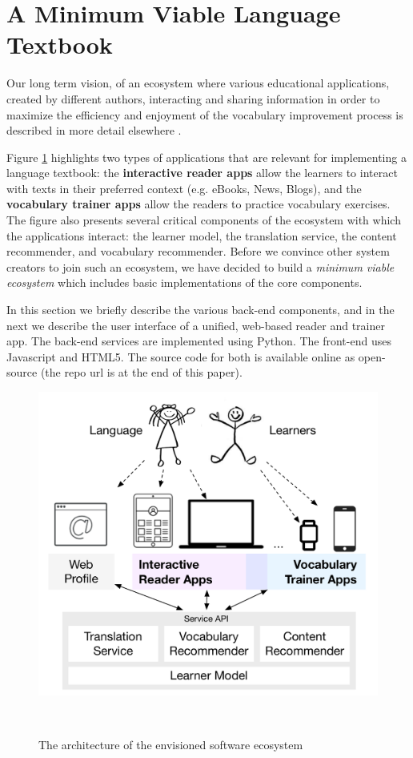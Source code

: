 
\section{A Minimum Viable Language Textbook}
\label{sec:system}

Our long term vision, of an ecosystem where various educational applications, created by different authors, interacting and sharing information in order to maximize the efficiency and enjoyment of the vocabulary improvement process is described in more detail elsewhere \cite{Lungu16}. 

Figure \ref{fig:architecture} highlights two types of applications that are relevant for implementing a language textbook: the {\bf interactive reader apps} allow the learners to interact with texts in their preferred context (e.g. eBooks, News, Blogs), and the {\bf vocabulary trainer apps} allow the readers to practice vocabulary exercises. 
% 
The figure also presents several critical components of the ecosystem with which the applications interact: the learner model, the translation service, the content recommender, and vocabulary recommender. Before we convince other system creators to join such an ecosystem, we have decided to build a {\em minimum viable ecosystem} which includes basic implementations of the core components. 

In this section we briefly describe the various back-end components, and in the next we describe the user interface of a unified, web-based reader and trainer app. The back-end services are implemented using Python. The front-end uses Javascript and HTML5. The source code for both is available online as open-source (the repo url is at the end of this paper).

\begin{figure}[h!]
\centering
  \includegraphics[width=0.75\columnwidth,trim={0 10 0 10},clip]{figures/zeeguu-architecture.pdf}
  \caption{The architecture of the envisioned software ecosystem}~\label{fig:architecture}
\end{figure}

